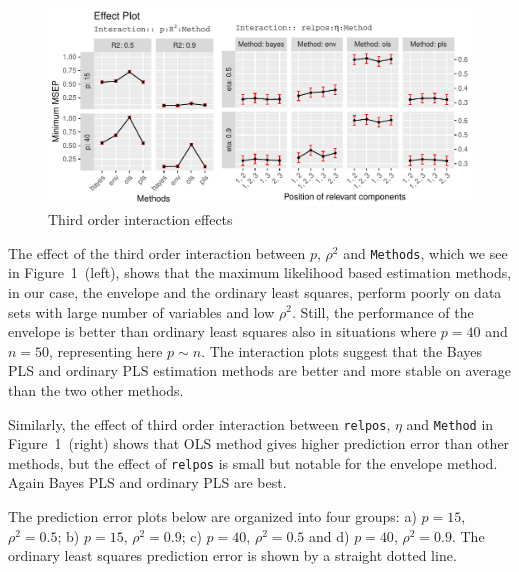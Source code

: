\documentclass[num-refs]{wiley-article}
\begin{document}
\begin{figure}[!ht]
\centering
\includegraphics[width=\textwidth]{effect-plot}
\caption{Third order interaction effects}
\label{fig:effect-plot}
\end{figure}

The effect of the third order interaction between $p$, $\rho^2$ and {\tt Methods}, which we see in Figure~1~(left), shows that the maximum likelihood based estimation methods, in our case, the envelope and the ordinary least squares, perform poorly on data sets with large number of variables and low $\rho^2$. Still, the performance of the envelope is better than ordinary least squares also in situations where $p=40$ and $n=50$, representing here $p\sim n$. The interaction plots suggest that the Bayes PLS and ordinary PLS estimation methods are better and more stable on average than the two other methods.

Similarly, the effect of third order interaction between {\tt relpos}, $\eta$ and {\tt Method} in Figure~1~(right) shows that OLS method gives higher prediction error than other methods, but the effect of {\tt relpos} is small but notable for the envelope method. Again Bayes PLS and ordinary PLS are best.

The prediction error plots below are organized into four groups:
a)  $p = 15$, $\rho^2 = 0.5$;
b) $p = 15$, $\rho^2 = 0.9$;
c) $p = 40$, $\rho^2 = 0.5$ and
d) $p = 40$, $\rho^2 = 0.9$.
The ordinary least squares prediction error is shown by a straight dotted line.

\end{document}
